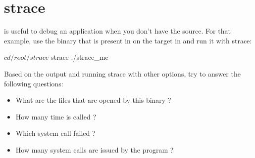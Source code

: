 \section{strace}

 is useful to debug an application when you don't have the source.
For that example, use the  binary that is present in on the
target in  and run it with strace:

\begin{bashinput}
$ cd /root/strace
$ strace ./strace_me
\end{bashinput}

Based on the output and running strace with other options, try to answer the
following questions:
\begin{itemize}
  \item What are the files that are opened by this binary ?
  \item How many time is  called ?
  \item Which  system call failed ?
  \item How many system calls are issued by the program ?
\end{itemize}